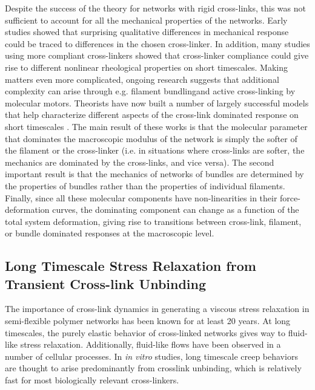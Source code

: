 Despite the success of the theory\cite{theo_best} for networks with rigid cross-links, this was not sufficient to account for all the mechanical properties of the networks. Early studies showed that surprising qualitative differences in mechanical response could be traced to differences in the chosen cross-linker\cite{rheo_crosslinkcompare,rheo_crosslinkreview}.  In addition, many studies using more compliant cross-linkers showed that cross-linker compliance could give rise to different nonlinear rheological properties on short timescales\cite{rheo_crosslink_nonlin1,rheo_crosslink_nonlin2,rheo_crosslink_nonlin3,rheo_crosslink_notactin}. Making matters even more complicated, ongoing research suggests that  additional complexity can arise through e.g.  filament bundling\cite{theo_crosslinkslip2,model_massive}and active cross-linking by molecular motors\cite{rheo_active}. Theorists have now built a number of largely successful models that help characterize different aspects of the cross-link dominated response on short timescales \cite{theo_nonaffine2,theo_floppy,theo_crosslinknonlinear}.  The main result of these works is that the molecular parameter that dominates the macroscopic modulus of the network is simply the softer of the filament or the cross-linker (i.e. in situations where cross-links are softer, the mechanics are dominated by the cross-links, and vice versa).  The second important result is that the mechanics of networks of bundles are determined by the properties of bundles rather than the properties of individual filaments.  Finally, since all these molecular components have non-linearities in their force-deformation curves, the dominating component can change as a function of the total system deformation, giving rise to transitions between cross-link, filament, or bundle dominated responses at the macroscopic level.

\subsection{Long Timescale Stress Relaxation from Transient Cross-link Unbinding}

The importance of cross-link dynamics in generating a viscous stress relaxation in semi-flexible polymer networks has been known for at least 20 years\cite{rheo_crosslinksmatter}. At long timescales, the purely elastic behavior of cross-linked networks gives way to fluid-like stress relaxation. Additionally, fluid-like flows have been observed in a number of cellular processes\cite{cellmech_flows,cellmech_flows2,cellmech_flows3,rheo_fluid,rheo_fluid2,cell_rheo_exp}.  In {\em in vitro} studies, long timescale creep behaviors are thought to arise predominantly from crosslink unbinding, which is relatively fast  for most biologically relevant cross-linkers\cite{rheo_crosslinkslip1, rheo_crosslinkslip2, rheo_crosslinkslip3, rheo_nonaffine}.  

